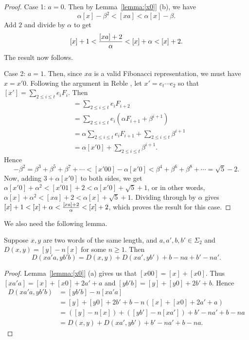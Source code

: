 \documentclass[12pt,reqno]{article}
\begin{document}
\begin{proof}
\leavevmode

\noindent Case 1: $a = 0$.  Then by Lemma~\ref{lemma:[x0]} (b),
we have
$$ \alpha[x]-\beta^2 < [xa] < \alpha[x]-\beta.$$
Add $2$ and divide by $\alpha$ to get
$$[x] + 1 < {{[xa]+2} \over \alpha} < [x] + \alpha < [x]+2.$$
The result now follows.

\medskip

\noindent Case 2: $a = 1$.  Then, since $xa$ is a valid Fibonacci
representation, we must have $x = x'0$.  Following the
argument in Reble \cite{reble_zeckendorf_2008}, let $x' = e_t \cdots e_2$
so that 
$[x'] = \sum_{2\leq i \leq t} e_i F_i$.  Then
\begin{align*}
    [x'00] &= \sum_{2 \leq i \leq t} e_i F_{i+2}\\
    &= \sum_{2 \leq i \leq t} e_i (\alpha F_{i+1} + \beta^{i+1}) \\
    &= \alpha \sum_{2 \leq i \leq t} e_i F_{i+1} + 
        \sum_{2 \leq i \leq t} \beta^{i+1} \\
        &= \alpha [x'0] + \sum_{2 \leq i \leq t} \beta^{i+1}.
\end{align*}
Hence 
$$-\beta^2 = \beta^3 + \beta^5 + \beta^7 + \cdots <
[x'00] - \alpha [x'0] < \beta^4 + \beta^6 + \beta^8 + \cdots = \sqrt{5} - 2.$$
Now, adding $3 + \alpha [x'0]$ to both sides, we get
$\alpha[x'0] +\alpha^2 < [x'01] + 2  < \alpha[x'0] + \sqrt{5} +1$, or
in other words,
$\alpha[x] + \alpha^2 < [xa]+2 < \alpha[x] + \sqrt{5} + 1 $.
Dividing through by $\alpha$ gives
$[x] + 1< [x] +\alpha  < {{[xa]+2}\over \alpha} < [x] + 2$,
which proves the result for this case.
\end{proof}

We also need the following lemma. 
\begin{lemma}
Suppose $x, y$ are two words of the same length,
and $a, a', b, b' \in \Sigma_2$ and $D(x, y) = [y]-n[x]$ for some $n\geq 1$.  Then
$$ D(xa'a,yb'b) = D(x,y) + D(xa',yb') + b-na + b'-na'.$$
\label{lemma:fib-update-rule}
\end{lemma}
\begin{proof}
Lemma~\ref{lemma:[x0]} (a) gives us that $[x00]= [x]+[x0]$.  Thus
$[x a' a] = [x] + [x0] + 2a' + a$ and
$[y b' b] = [y] + [y0] + 2b' + b$.
Hence
\begin{align*}
D(xa'a, yb'b) &= [y b' b]-n[x a' a]  \\
&= [y] + [y0] + 2b' + b - n([x] + [x0] + 2a' + a) \\
&= ([y]-n[x]) + ([yb'] - n[xa']) +  b'-na' + b-na \\
&= D(x,y) + D(xa', yb') + b'-na' + b-na.
\end{align*}
\end{proof}
\end{document}
